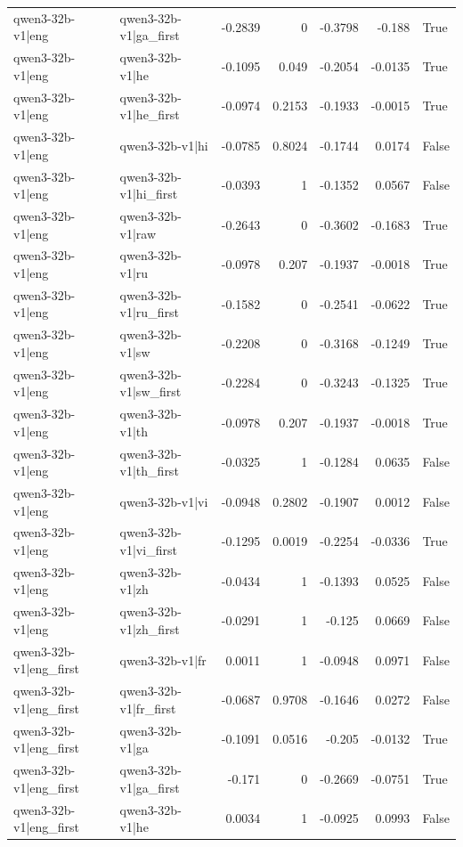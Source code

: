 \begin{table}
\begin{tabular}{l l r r r r l}
qwen3-32b-v1|eng & qwen3-32b-v1|ga_first & -0.2839 & 0 & -0.3798 & -0.188 & True \\
qwen3-32b-v1|eng & qwen3-32b-v1|he & -0.1095 & 0.049 & -0.2054 & -0.0135 & True \\
qwen3-32b-v1|eng & qwen3-32b-v1|he_first & -0.0974 & 0.2153 & -0.1933 & -0.0015 & True \\
qwen3-32b-v1|eng & qwen3-32b-v1|hi & -0.0785 & 0.8024 & -0.1744 & 0.0174 & False \\
qwen3-32b-v1|eng & qwen3-32b-v1|hi_first & -0.0393 & 1 & -0.1352 & 0.0567 & False \\
qwen3-32b-v1|eng & qwen3-32b-v1|raw & -0.2643 & 0 & -0.3602 & -0.1683 & True \\
qwen3-32b-v1|eng & qwen3-32b-v1|ru & -0.0978 & 0.207 & -0.1937 & -0.0018 & True \\
qwen3-32b-v1|eng & qwen3-32b-v1|ru_first & -0.1582 & 0 & -0.2541 & -0.0622 & True \\
qwen3-32b-v1|eng & qwen3-32b-v1|sw & -0.2208 & 0 & -0.3168 & -0.1249 & True \\
qwen3-32b-v1|eng & qwen3-32b-v1|sw_first & -0.2284 & 0 & -0.3243 & -0.1325 & True \\
qwen3-32b-v1|eng & qwen3-32b-v1|th & -0.0978 & 0.207 & -0.1937 & -0.0018 & True \\
qwen3-32b-v1|eng & qwen3-32b-v1|th_first & -0.0325 & 1 & -0.1284 & 0.0635 & False \\
qwen3-32b-v1|eng & qwen3-32b-v1|vi & -0.0948 & 0.2802 & -0.1907 & 0.0012 & False \\
qwen3-32b-v1|eng & qwen3-32b-v1|vi_first & -0.1295 & 0.0019 & -0.2254 & -0.0336 & True \\
qwen3-32b-v1|eng & qwen3-32b-v1|zh & -0.0434 & 1 & -0.1393 & 0.0525 & False \\
qwen3-32b-v1|eng & qwen3-32b-v1|zh_first & -0.0291 & 1 & -0.125 & 0.0669 & False \\
qwen3-32b-v1|eng_first & qwen3-32b-v1|fr & 0.0011 & 1 & -0.0948 & 0.0971 & False \\
qwen3-32b-v1|eng_first & qwen3-32b-v1|fr_first & -0.0687 & 0.9708 & -0.1646 & 0.0272 & False \\
qwen3-32b-v1|eng_first & qwen3-32b-v1|ga & -0.1091 & 0.0516 & -0.205 & -0.0132 & True \\
qwen3-32b-v1|eng_first & qwen3-32b-v1|ga_first & -0.171 & 0 & -0.2669 & -0.0751 & True \\
qwen3-32b-v1|eng_first & qwen3-32b-v1|he & 0.0034 & 1 & -0.0925 & 0.0993 & False \\

\end{tabular}
\end{table}

